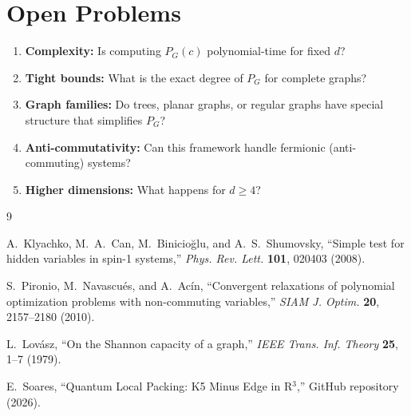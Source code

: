 \documentclass[11pt]{article}
\theoremstyle{definition}
\begin{document}
\section{Open Problems}

\begin{enumerate}
    \item \textbf{Complexity:} Is computing $P_G(c)$ polynomial-time for fixed $d$?

    \item \textbf{Tight bounds:} What is the exact degree of $P_G$ for complete graphs?

    \item \textbf{Graph families:} Do trees, planar graphs, or regular graphs have
    special structure that simplifies $P_G$?

    \item \textbf{Anti-commutativity:} Can this framework handle fermionic
    (anti-commuting) systems?

    \item \textbf{Higher dimensions:} What happens for $d \ge 4$?
\end{enumerate}

\begin{thebibliography}{9}

A.~Klyachko, M.~A.~Can, M.~Binicio{\u{g}}lu, and A.~S.~Shumovsky,
``Simple test for hidden variables in spin-1 systems,''
\textit{Phys. Rev. Lett.} \textbf{101}, 020403 (2008).

S.~Pironio, M.~Navascu\'{e}s, and A.~Ac\'{i}n,
``Convergent relaxations of polynomial optimization problems with
non-commuting variables,''
\textit{SIAM J. Optim.} \textbf{20}, 2157--2180 (2010).

L.~Lov\'{a}sz,
``On the Shannon capacity of a graph,''
\textit{IEEE Trans. Inf. Theory} \textbf{25}, 1--7 (1979).

E.~Soares,
``Quantum Local Packing: K5 Minus Edge in R$^3$,''
GitHub repository (2026).

\end{thebibliography}
\end{document}
